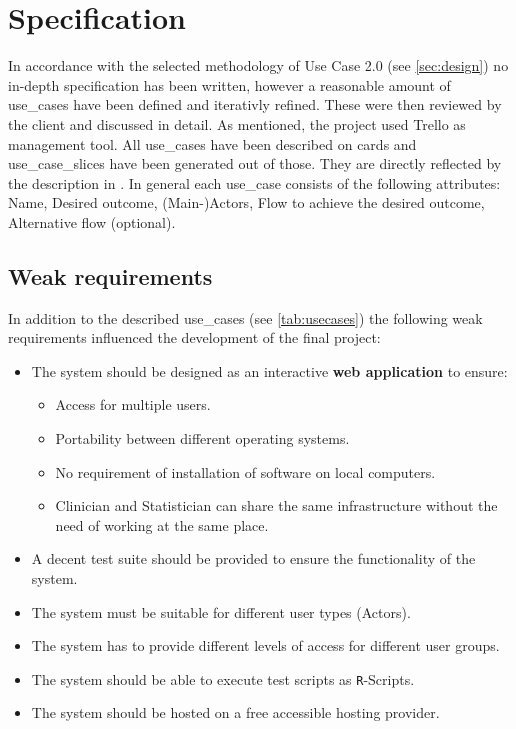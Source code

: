 \section{Specification}
\label{sec:specification}

In accordance with the selected methodology of Use Case 2.0 (see \autoref{sec:design}) no in-depth specification has been written, however a reasonable amount of \glspl{use_case} have been defined and iterativly refined. These were then reviewed by the client and discussed in detail. As mentioned, the project used Trello as management tool. All \glspl{use_case} have been described on cards and \glspl{use_case_slice} have been generated out of those. They are directly reflected by the description in \cite{sassoon2014,sassoon2016, sassoon2016CD}. In general each \gls{use_case} consists of the following attributes: Name, Desired outcome, (Main-)\glspl{Actor}, Flow to achieve the desired outcome, Alternative flow (optional).


\subsection{Weak requirements}
In addition to the described \glspl{use_case} (see \autoref{tab:usecases}) the following weak requirements influenced the development of the final project:

\bigskip 

\begin{itemize}
	\item The system should be designed as an interactive \textbf{web application} to ensure:
	\begin{itemize}
		\item Access for multiple users.
		\item Portability between different operating systems.
		\item No requirement of installation of software on local computers.
		\item Clinician and Statistician can share the same infrastructure without the need of working at the same place.
	\end{itemize}
	\item A decent test suite should be provided to ensure the functionality of the system.
	\item The system must be suitable for different user types (\glspl{Actor}).
	\item The system has to provide different levels of access for different user groups.
	\item The system should be able to execute test scripts as \texttt{R}-Scripts.
	\item The system should be hosted on a free accessible hosting provider.
\end{itemize}


